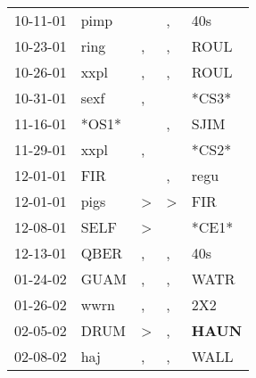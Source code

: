 \begin{supertabular}{p{0.07\textwidth}p{0.06\textwidth}p{0.02\textwidth}p{0.02\textwidth}p{0.06\textwidth}}
          10-11-01\textsuperscript{} &           pimp\textsuperscript{} &                  &                , &            40s\textsuperscript{} \\
          10-23-01\textsuperscript{} &           ring\textsuperscript{} &                , &                , &           ROUL\textsuperscript{} \\
          10-26-01\textsuperscript{} &           xxpl\textsuperscript{} &                , &                , &           ROUL\textsuperscript{} \\
          10-31-01\textsuperscript{} &           sexf\textsuperscript{} &                , &                  &                            *CS3* \\
          11-16-01\textsuperscript{} &                            *OS1* &                  &                , &           SJIM\textsuperscript{} \\
          11-29-01\textsuperscript{} &           xxpl\textsuperscript{} &                , &                  &                            *CS2* \\
          12-01-01\textsuperscript{} &            FIR\textsuperscript{} &                  &                , &           regu\textsuperscript{} \\
          12-01-01\textsuperscript{} &           pigs\textsuperscript{} &     \textgreater &     \textgreater &            FIR\textsuperscript{} \\
          12-08-01\textsuperscript{} &           SELF\textsuperscript{} &     \textgreater &                  &                            *CE1* \\
          12-13-01\textsuperscript{} &           QBER\textsuperscript{} &                , &                , &            40s\textsuperscript{} \\
          01-24-02\textsuperscript{} &           GUAM\textsuperscript{} &                , &                , &           WATR\textsuperscript{} \\
          01-26-02\textsuperscript{} &           wwrn\textsuperscript{} &                , &                , &            2X2\textsuperscript{} \\
          02-05-02\textsuperscript{} &           DRUM\textsuperscript{} &     \textgreater &                , &  \textbf{HAUN\textsuperscript{}} \\
          02-08-02\textsuperscript{} &            haj\textsuperscript{} &                , &                , &           WALL\textsuperscript{} \\

\end{supertabular}

